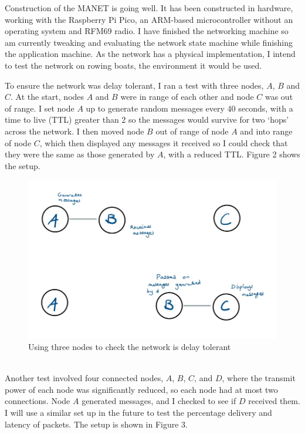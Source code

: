 \documentclass[10pt, a4paper]{article}
\begin{document}
Construction of the MANET is going well. It has been constructed in hardware, working with the Raspberry Pi Pico, an ARM-based microcontroller without an operating system \cite{pico} and RFM69 radio. I have finished the networking machine so am currently tweaking and evaluating the network state machine while finishing the application machine. As the network has a physical implementation, I intend to test the network on rowing boats, the environment it would be used. 

To ensure the network was delay tolerant, I ran a test with three nodes, $A$, $B$ and $C$. At the start, nodes $A$ and $B$ were in range of each other and node $C$ was out of range. I set node $A$ up to generate random messages every 40 seconds, with a time to live (TTL) greater than 2 so the messages would survive for two `hops' across the network. I then moved node $B$ out of range of node $A$ and into range of node $C$, which then displayed any messages it received so I could check that they were the same as those generated by $A$, with a reduced TTL. Figure 2 shows the setup.
\begin{figure}[h]
\caption{Using three nodes to check the network is delay tolerant}
\begin{center}
\includegraphics[scale=0.4]{test1.jpg}
\end{center}
\end{figure} \\
Another test involved four connected nodes, $A$, $B$, $C$, and $D$, where the transmit power of each node was significantly reduced, so each node had at most two connections. Node $A$ generated messages, and I checked to see if $D$ received them. I will use a similar set up in the future to test the percentage delivery and latency of packets. The setup is shown in Figure 3.
\end{document}
